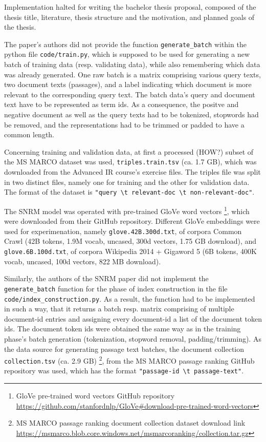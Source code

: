 Implementation halted for writing the bachelor thesis proposal, composed of the thesis title, literature, thesis structure and the motivation, 
    and planned goals of the thesis.

The paper's authors did not provide the function \verb|generate_batch| within the python file \verb|code/train.py|, 
    which is supposed to be used for generating a new batch of training data (resp. validating data), while also remembering which 
    data was already generated.
One raw batch is a matrix comprising various query texts, two document texts (passages), and a label indicating which document 
    is more relevant to the corresponding query text.
The batch data's query and document text have to be represented as term ids. 
As a consequence, the positve and negative document as well as the query texts had to be tokenized, stopwords had be removed,
    and the representations had to be trimmed or padded to have a common length.

Concerning training and validation data, at first a processed (HOW?) subset of the MS MARCO dataset was used, 
    \verb|triples.train.tsv| (ca. 1.7 GB), which was downloaded from the Advanced IR course's exercise files.
The triples file was split in two distinct files, namely one for training and the other for validation data.
The format of the dataset is \verb|"query \t relevant-doc \t non-relevant-doc"|.

The SNRM model was operated with pre-trained GloVe word vectors
    \footnote{GloVe pre-trained word vectors GitHub repository \url{https://github.com/stanfordnlp/GloVe\#download-pre-trained-word-vectors}},
    which were downloaded from their GitHub repository.
Different GloVe embeddings were used for experimenation, namely \verb|glove.42B.300d.txt|, 
    of corpora Common Crawl (42B tokens, 1.9M vocab, uncased, 300d vectors, 1.75 GB download), 
    and \verb|glove.6B.100d.txt|, of corpora Wikipedia 2014 + Gigaword 5 (6B tokens, 400K vocab, uncased, 100d vectors, 822 MB download).


Similarly, the authors of the SNRM paper did not implement the \verb|generate_batch| function for the phase of index construction in 
    the file \verb|code/index_construction.py|. As a result, the function had to be implemented in such a way, that it returns a
    batch resp. matrix comprising of multiple document-id entries and assigning every document-id a list of the document token ids.
    The document token ids were obtained the same way as in the training phase's batch generation 
    (tokenization, stopword removal, padding/trimming).
As the data source for generating passage text batches, the document collection \verb|collection.tsv| (ca. 2.9 GB)
    \footnote{MS MARCO passage ranking document collection dataset download link 
    \url{https://msmarco.blob.core.windows.net/msmarcoranking/collection.tar.gz}}, 
    from the MS MARCO passage ranking GitHub repository was used, which has the format \verb|"passage-id \t passage-text"|.

